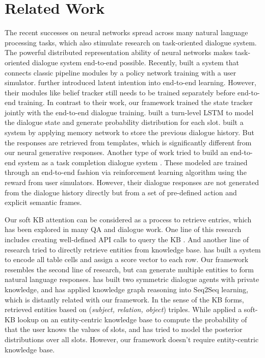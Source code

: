 \documentclass[11pt]{article}
\begin{document}
\section{Related Work}
The recent successes on neural networks spread across many natural language processing tasks, which also stimulate research on task-oriented dialogue system. 
The powerful distributed representation ability of neural networks makes task-oriented dialogue system end-to-end possible. 
Recently,  built a system that connects classic pipeline modules by a policy network training with a user simulator.  further introduced latent intention into end-to-end learning.
However, their modules like belief tracker still needs to be trained separately before end-to-end training. 
In contrast to their work, our framework trained the state tracker jointly with the end-to-end dialogue training.  built a turn-level LSTM to model the dialogue state and generate probability distribution for each slot.
  built a system by applying memory network to store the previous dialogue history. But the responses are retrieved from templates, which is significantly different from our neural generative responses. Another type of work tried to build an end-to-end system as a task completion dialogue system \cite{li:2016:arxiv,li:2017:IJCNLP,peng:2017:EMNLP}. These modeled are trained through an end-to-end fashion via reinforcement learning algorithm using the reward from user simulators. However, their dialogue responses are not generated from the dialogue history directly but from a set of pre-defined action and explicit semantic frames.
 
Our soft KB attention can be considered as a process to retrieve entries, which has been explored in many QA and dialogue work.
One line of this research includes creating well-defined API calls to query the KB \cite{williams-asadi-zweig:2017:ACL,wen:2017:ICML}.
And another line of research tried to directly retrieve entities from knowledge base.
  has built a system to encode all table cells and assign a score vector to each row. Our framework resembles the second line of research, but can generate multiple entities to form natural language responses. 
 has built two symmetric dialogue agents with private knowledge, and has applied knowledge graph reasoning into Seq2Seq learning, which is distantly related with our framework.
 In the sense of the KB forms,  retrieved entities based on (\textit{subject, relation, object}) triples. 
 While  applied a soft-KB lookup on an entity-centric knowledge base to compute the probability of that the user knows the values of slots, and has tried to model the posterior distributions over all slots. 
 However, our framework doesn't require entity-centric knowledge base.
\end{document}
